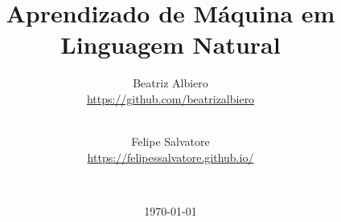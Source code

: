 \title{Aprendizado de Máquina em Linguagem Natural}
\date{\today}

\author{
  Beatriz Albiero\\
  \url{https://github.com/beatrizalbiero}
  \vspace{0.1 cm}
  \and\\ 
  Felipe Salvatore\\
  \url{https://felipessalvatore.github.io/}
  \vspace{0.1 cm}
  \and\\
}

